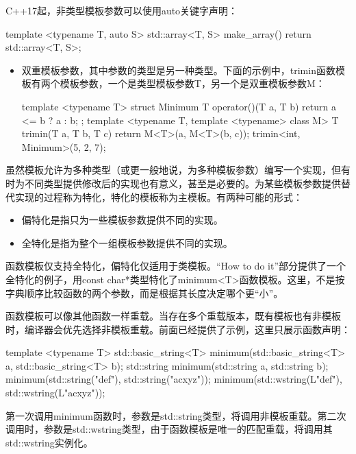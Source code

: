C++17起，非类型模板参数可以使用auto关键字声明：

\begin{cpp}
template <typename T, auto S>
std::array<T, S> make_array()
{
    return std::array<T, S>{};
}
\end{cpp}

\begin{itemize}
\item
双重模板参数，其中参数的类型是另一种类型。下面的示例中，trimin函数模板有两个模板参数，一个是类型模板参数T，另一个是双重模板参数M：

\begin{cpp}
template <typename T>
struct Minimum
{
    T operator()(T a, T b)
    {
        return a <= b ? a : b;
    }
};
template <typename T, template <typename> class M>
T trimin(T a, T b, T c)
{
    return M<T>{}(a, M<T>{}(b, c));
}
trimin<int, Minimum>(5, 2, 7);
\end{cpp}
\end{itemize}

虽然模板允许为多种类型（或更一般地说，为多种模板参数）编写一个实现，但有时为不同类型提供修改后的实现也有意义，甚至是必要的。为某些模板参数提供替代实现的过程称为特化，特化的模板称为主模板。有两种可能的形式：

\begin{itemize}
\item
偏特化是指只为一些模板参数提供不同的实现。

\item
全特化是指为整个一组模板参数提供不同的实现。
\end{itemize}

函数模板仅支持全特化，偏特化仅适用于类模板。“How to do it”部分提供了一个全特化的例子，用const char*类型特化了minimum<T>函数模板。这里，不是按字典顺序比较函数的两个参数，而是根据其长度决定哪个更“小”。

函数模板可以像其他函数一样重载。当存在多个重载版本，既有模板也有非模板时，编译器会优先选择非模板重载。前面已经提供了示例，这里只展示函数声明：

\begin{cpp}
template <typename T>
std::basic_string<T> minimum(std::basic_string<T> a, std::basic_string<T> b);
std::string minimum(std::string a, std::string b);
minimum(std::string("def"), std::string("acxyz"));
minimum(std::wstring(L"def"), std::wstring(L"acxyz"));
\end{cpp}

第一次调用minimum函数时，参数是std::string类型，将调用非模板重载。第二次调用时，参数是std::wstring类型，由于函数模板是唯一的匹配重载，将调用其std::wstring实例化。

